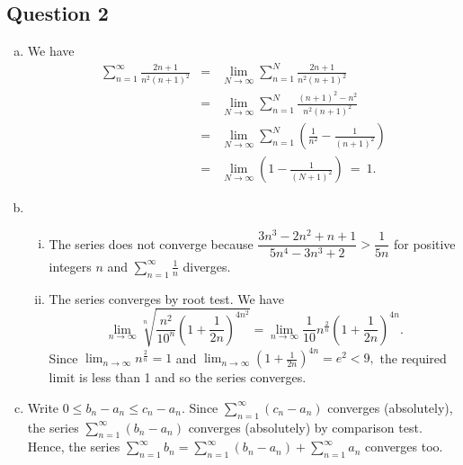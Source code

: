 \documentclass{article}
\begin{document}
\subsection*{Question 2}
\begin{enumerate}[(a)]
    \item We have 
    \begin{eqnarray*}
    \sum_{n=1}^{\infty}\frac{2n+1}{n^2(n+1)^2}&=&\lim_{N\to\infty}\sum_{n=1}^{N}\frac{2n+1}{n^2(n+1)^2}\\
    &=&\lim_{N\to\infty}\sum_{n=1}^{N}\frac{(n+1)^2-n^2}{n^2(n+1)^2}\\
    &=&\lim_{N\to\infty}\sum_{n=1}^{N}\left(\frac{1}{n^2}-\frac{1}{(n+1)^2}\right)\\
    &=&\lim_{N\to\infty}\left(1-\frac{1}{(N+1)^2}\right)\ =\ 1.
    \end{eqnarray*}
    \item \begin{enumerate}[(i)]
        \item The series does not converge because $\dfrac{3n^3-2n^2+n+1}{5n^4-3n^3+2}>\dfrac{1}{5n}$ for positive integers $n$ and $\displaystyle\sum^{\infty}_{n=1}\frac{1}{n}$ diverges.
        \item The series converges by root test. We have $$\lim_{n\to\infty}\sqrt[n]{\frac{n^2}{10^n}\left(1+\frac{1}{2n}\right)^{4n^2}}=\lim_{n\to\infty}\frac{1}{10}n^{\frac{2}{n}}\left(1+\frac{1}{2n}\right)^{4n}.$$
        Since $\displaystyle\lim_{n\to\infty}n^{\frac{2}{n}}=1$ and $\displaystyle\lim_{n\to\infty}\left(1+\frac{1}{2n}\right)^{4n}=e^2<9,$ the required limit is less than 1 and so the series converges.
    \end{enumerate}
    \item Write $0\leq b_n-a_n\leq c_n-a_n.$ Since $\displaystyle\sum^{\infty}_{n=1}(c_n-a_n)$ converges (absolutely), the series $\displaystyle\sum^{\infty}_{n=1}(b_n-a_n)$ converges (absolutely) by comparison test. Hence, the series $\displaystyle\sum^{\infty}_{n=1}b_n=\displaystyle\sum^{\infty}_{n=1}(b_n-a_n)+\displaystyle\sum^{\infty}_{n=1}a_n$ converges too.
\end{enumerate}
\end{document}
